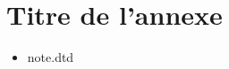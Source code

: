 
\chapter{Titre de l'annexe}
\label{semantique.ann}

\begin{itemize}
\item note.dtd
\end{itemize}

\newpage
\addtocounter{page}{9} %
